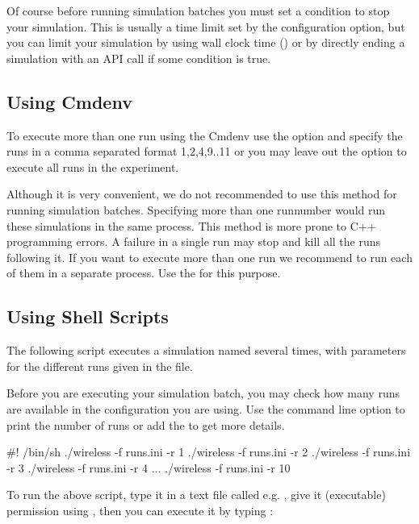 Of course before running simulation batches you must set a condition to
stop your simulation. This is usually a time limit set by the
 configuration option, but you can limit your simulation
by using wall clock time () or by directly ending a
simulation with an API call if some condition is true.

\subsection{Using Cmdenv}

  To execute more than one run using the Cmdenv use the  option
  and specify the runs in a comma separated format 1,2,4,9..11 or you may leave
  out the  option to execute all runs in the experiment.

\begin{warning}
  Although it is very convenient, we do not recommended to use this method for
  running simulation batches. Specifying more than one runnumber
  would run these simulations in the same process. This method is more prone to C++ programming
  errors. A failure in a single run may stop and kill all the runs following it. If you want
  to execute more than one run we recommend to run each of them in a separate process.
  Use the  for this purpose.
\end{warning}


\subsection{Using Shell Scripts}

The following script executes a simulation named 
several times, with parameters for the different runs
given in the  file.

Before you are executing your simulation batch, you may check how many
runs are available in the configuration you are using. Use the
 command line option to print the number of runs or
add the  to get more details.

\begin{filelisting}
#! /bin/sh
./wireless -f runs.ini -r 1
./wireless -f runs.ini -r 2
./wireless -f runs.ini -r 3
./wireless -f runs.ini -r 4
...
./wireless -f runs.ini -r 10
\end{filelisting}

To run the above script, type it in a text file called e.g. ,
give it  (executable) permission using ,
then you can execute it by typing :

